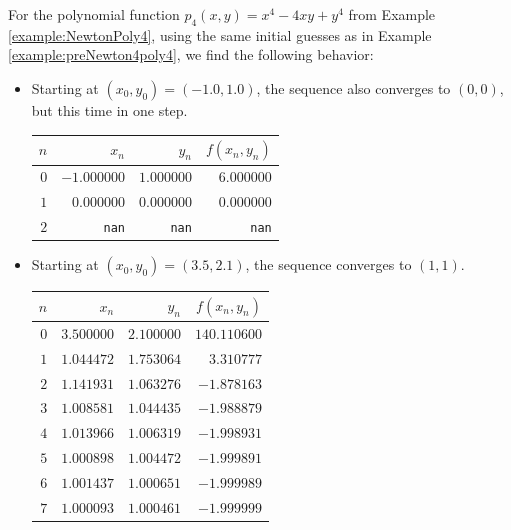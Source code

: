 \begin{example}
For the polynomial function $p_4(x,y) = x^4-4xy+y^4$ from Example \ref{example:NewtonPoly4}, using the same initial guesses as in Example \ref{example:preNewton4poly4}, we find the following behavior:
\begin{itemize}
	\item Starting at $(x_0, y_0) = (-1.0,1.0)$, the sequence also converges to $(0,0)$, but this time in one step.
	\begin{center}
	\begin{tabular}{|r|r|r|r|} \hline 
	$n$ & $x_n$ & $y_n$ & $f(x_n,y_n)$ \\ \hline \hline 
	$0$ & $-1.000000$ & $1.000000$ & $6.000000$ \\ \hline 
	$1$ & $0.000000$ & $0.000000$ & $0.000000$ \\ \hline 
	$2$ & \texttt{nan} & \texttt{nan} & \texttt{nan} \\ \hline 
	\end{tabular}
	\end{center}
	\item Starting at $(x_0,y_0) = (3.5, 2.1)$, the sequence converges to $(1,1)$.
	\begin{center}
	\begin{tabular}{|r|r|r|r|} \hline 
	$n$ & $x_n$ & $y_n$ & $f(x_n,y_n)$ \\ \hline \hline 
	$0$ & $3.500000$ & $2.100000$ & $140.110600$ \\ \hline 
	$1$ & $1.044472$ & $1.753064$ & $3.310777$ \\ \hline 
	$2$ & $1.141931$ & $1.063276$ & $-1.878163$ \\ \hline 
	$3$ & $1.008581$ & $1.044435$ & $-1.988879$ \\ \hline 
	$4$ & $1.013966$ & $1.006319$ & $-1.998931$ \\ \hline 
	$5$ & $1.000898$ & $1.004472$ & $-1.999891$ \\ \hline 
	$6$ & $1.001437$ & $1.000651$ & $-1.999989$ \\ \hline 
	$7$ & $1.000093$ & $1.000461$ & $-1.999999$ \\ \hline 
	\end{tabular}~\begin{tabular}{|r|r|r|r|} \hline 

\end{tabular}
\end{center}
\end{itemize}
\end{example}

